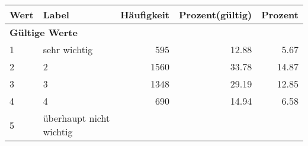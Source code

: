     \begin{longtable}{lXrrr}
     \toprule
     \textbf{Wert} & \textbf{Label} & \textbf{Häufigkeit} & \textbf{Prozent(gültig)} & \textbf{Prozent} \\
     \endhead
     \midrule
     \multicolumn{5}{l}{\textbf{Gültige Werte}}\\

     1 &
     \multicolumn{1}{X}{ sehr wichtig   } &


       \num{595} &
       \num[round-mode=places,round-precision=2]{12,88} &
         \num[round-mode=places,round-precision=2]{5,67} \\

     2 &
     \multicolumn{1}{X}{ 2   } &


       \num{1560} &
       \num[round-mode=places,round-precision=2]{33,78} &
         \num[round-mode=places,round-precision=2]{14,87} \\

     3 &
     \multicolumn{1}{X}{ 3   } &


       \num{1348} &
       \num[round-mode=places,round-precision=2]{29,19} &
         \num[round-mode=places,round-precision=2]{12,85} \\

     4 &
     \multicolumn{1}{X}{ 4   } &


       \num{690} &
       \num[round-mode=places,round-precision=2]{14,94} &
         \num[round-mode=places,round-precision=2]{6,58} \\

     5 &
     \multicolumn{1}{X}{ überhaupt nicht wichtig   } &



\end{longtable}
